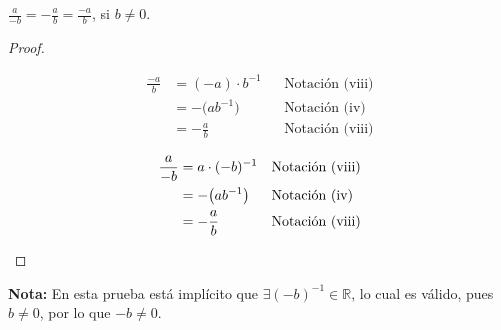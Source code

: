 \documentclass[11pt]{article}
\newcommand{\R}{\mathbb{R}}
\begin{document}
$\frac{a}{-b} = -\frac{a}{b}=\frac{-a}{b}$, si $b\neq 0$.
    \vspace{-1em}\begin{proof} \leavevmode
        \begin{center}\vspace{-2em}
            \begin{minipage}[t]{.5\linewidth}
                \begin{align*}
                    \frac{-a}{b} &= (-a)\cdot b^{-1} && \text{Notación (viii)}\\
                    &= - \bigl(ab^{-1}\bigr) && \text{Notación (iv)}\\
                    &= -\frac{a}{b} && \text{Notación (viii)}
                \end{align*}
            \end{minipage}%
            \begin{minipage}[t]{.5\linewidth}
                \begin{align*}
                    \frac{a}{-b} &= a \cdot (-b)^{-1} && \text{Notación (viii)}\\
            &= -\bigl(ab^{-1}\bigr) && \text{Notación (iv)}\\
            &= -\frac{a}{b} && \text{Notación (viii)} \qedhere
                \end{align*}
            \end{minipage}
            \end{center}    
    \end{proof} \vspace{-1em}
    \textbf{Nota:} En esta prueba está implícito que $\exists (-b)^{-1}\in \R$, lo cual es válido, pues $b\neq 0$, por lo que $-b\neq 0$.
\end{document}
